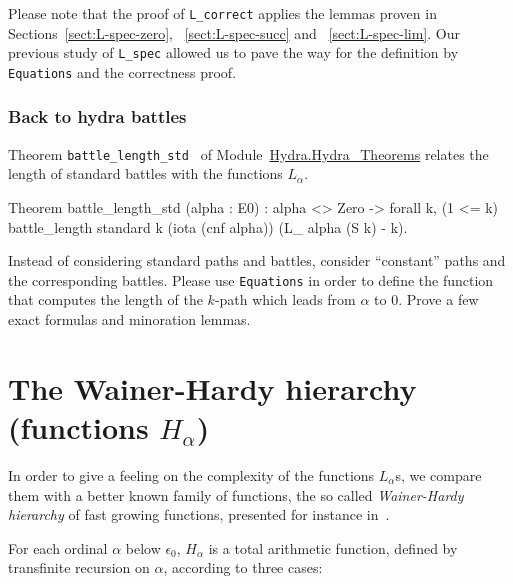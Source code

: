 Please note that the proof of \texttt{L\_correct} applies the lemmas proven in Sections~\ref{sect:L-spec-zero}, ~\ref{sect:L-spec-succ} and ~\ref{sect:L-spec-lim}.
Our previous study of \texttt{L\_spec} allowed us to pave the way for the definition by \texttt{Equations} and the correctness proof.



\subsubsection{Back to hydra battles}

Theorem \texttt{battle\_length\_std } of
Module~\href{../theories/html/hydras.Hydra.Hydra_Theorems.html\#battle_length_std}{Hydra.Hydra\_Theorems} relates the length of standard battles with the functions $L_\alpha$.

\begin{Coqsrc}
Theorem battle_length_std (alpha : E0)  :
  alpha <> Zero ->
  forall k, (1 <= k)%
            battle_length standard k (iota (cnf alpha))
                         (L_ alpha (S k) - k).
\end{Coqsrc}


\begin{project}
Instead of considering standard paths and battles, consider ``constant'' paths and the corresponding battles. Please use \texttt{Equations} in order to define the function that computes the length of the $k$-path which leads  from $\alpha$ to $0$.
Prove a few  exact formulas and minoration lemmas.
\end{project}

\section{The Wainer-Hardy hierarchy (functions \texorpdfstring{$H_\alpha$}{\texttt{H\_alpha}})}

\label{sect:hardy}
In order to give a feeling on  the complexity of the functions  $L_\alpha$s, we compare them with a better known family of functions, the so called \emph{Wainer-Hardy hierarchy} of fast growing functions,
presented for instance in~\cite{Promel2013}. 

For each ordinal $\alpha$ below $\epsilon_0$, $H_\alpha$ is a 
total arithmetic function, defined  by  transfinite recursion on $\alpha$, according to three cases:


